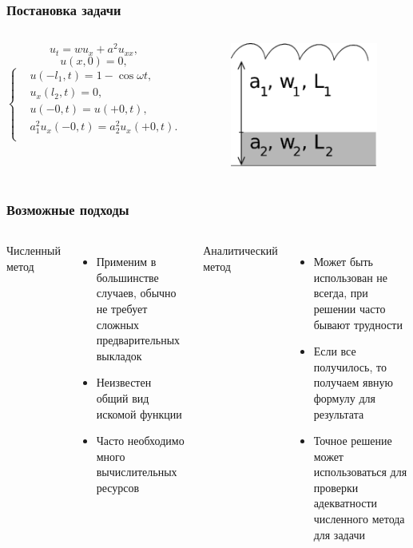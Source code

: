 \documentclass[10pt,pdf,hyperref={unicode}]{beamer}
\begin{document}
\begin{frame}
  \frametitle{Постановка задачи}

  \begin{columns}
  \begin{equation*}
   u_t = wu_x + a^2 u_{xx},
  \end{equation*}
  \begin{equation*}
   u(x,0) = 0,
  \end{equation*}
  \begin{equation*}
    \left\{
    \begin{aligned}
      & u(-l_1,t) = 1 - \cos \omega t, \\
      & u_x(l_2,t) = 0, \\
      & u(-0, t) = u(+0, t), \\
      & a_1^2 u_{x}(-0, t) = a_2^2 u_{x}(+0, t). \\
    \end{aligned}
    \right.
  \end{equation*}
  \begin{figure}[ht]
    \begin{center}
      \includegraphics[width=5cm]{int4.eps}
    \end{center}
  \end{figure}
  \end{columns}
\end{frame}

\begin{frame}
  \frametitle{Возможные подходы}
  \begin{columns}
    Численный метод
    \begin{itemize}
      \item Применим в большинстве случаев, обычно не требует сложных предварительных выкладок
      \item Неизвестен общий вид искомой функции
      \item Часто необходимо много вычислительных ресурсов
    \end{itemize}

    Аналитический метод
    \begin{itemize}
      \item Может быть использован не всегда, при решении часто бывают трудности
      \item Если все получилось, то получаем явную формулу для результата
      \item Точное решение может использоваться для проверки адекватности численного метода для задачи
    \end{itemize}
  \end{columns}
\end{frame}
\end{document}

